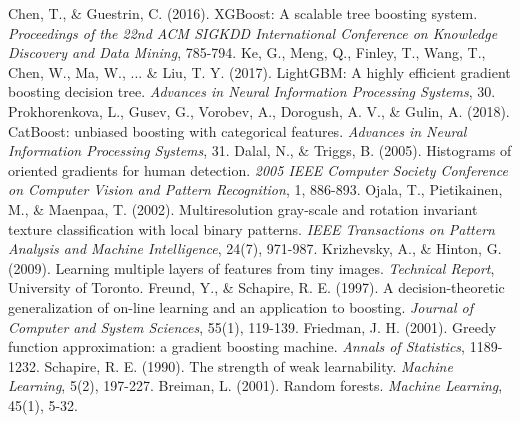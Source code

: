 \documentclass[UTF8]{report}
\theoremstyle{MyLineTheoremStyle} %
\theoremstyle{MyBlockTheoremStyle} %
\theoremstyle{MySubsubsectionStyle} %
\begin{document}
\begin{thebibliography}{99}
     Chen, T., \& Guestrin, C. (2016). XGBoost: A scalable tree boosting system. \textit{Proceedings of the 22nd ACM SIGKDD International Conference on Knowledge Discovery and Data Mining}, 785-794.
     Ke, G., Meng, Q., Finley, T., Wang, T., Chen, W., Ma, W., ... \& Liu, T. Y. (2017). LightGBM: A highly efficient gradient boosting decision tree. \textit{Advances in Neural Information Processing Systems}, 30.
     Prokhorenkova, L., Gusev, G., Vorobev, A., Dorogush, A. V., \& Gulin, A. (2018). CatBoost: unbiased boosting with categorical features. \textit{Advances in Neural Information Processing Systems}, 31.
     Dalal, N., \& Triggs, B. (2005). Histograms of oriented gradients for human detection. \textit{2005 IEEE Computer Society Conference on Computer Vision and Pattern Recognition}, 1, 886-893.
     Ojala, T., Pietikainen, M., \& Maenpaa, T. (2002). Multiresolution gray-scale and rotation invariant texture classification with local binary patterns. \textit{IEEE Transactions on Pattern Analysis and Machine Intelligence}, 24(7), 971-987.
     Krizhevsky, A., \& Hinton, G. (2009). Learning multiple layers of features from tiny images. \textit{Technical Report}, University of Toronto.
     Freund, Y., \& Schapire, R. E. (1997). A decision-theoretic generalization of on-line learning and an application to boosting. \textit{Journal of Computer and System Sciences}, 55(1), 119-139.
     Friedman, J. H. (2001). Greedy function approximation: a gradient boosting machine. \textit{Annals of Statistics}, 1189-1232.
     Schapire, R. E. (1990). The strength of weak learnability. \textit{Machine Learning}, 5(2), 197-227.
     Breiman, L. (2001). Random forests. \textit{Machine Learning}, 45(1), 5-32.
\end{thebibliography}
\end{document}

